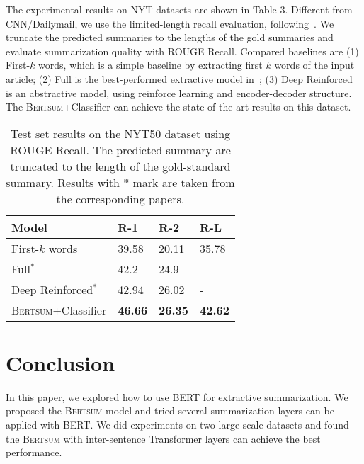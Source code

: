     The experimental results on NYT datasets are shown in Table 3. Different from CNN/Dailymail, we use the limited-length recall evaluation, following~\citet{durrett2016learning}. We truncate the predicted summaries to the lengths of the gold summaries and evaluate summarization quality with ROUGE Recall. 
    Compared baselines are (1) First-$k$ words, which is a simple baseline by extracting first $k$ words of the input article; (2) Full is the best-performed extractive model in~\citet{durrett2016learning}; (3) Deep Reinforced~\cite{paulus2017deep} is an abstractive model, using reinforce learning and encoder-decoder structure. The \textsc{Bertsum}+Classifier  can achieve the state-of-the-art results on this dataset.
    
    

    
    \begin{table}[!htbp]
        \center
        \begin{tabular}{l|lll}
            Model           & R-1    & R-2    & R-L    \\ \hline
            First-$k$ words   &39.58 & 20.11 & 35.78 \\
            Full$^*$            & 42.2  & 24.9  & -     \\
            Deep Reinforced$^*$ & 42.94 &26.02 & -     \\
            \textsc{Bertsum}+Classifier          & \textbf{46.66}    &  \textbf{26.35 } & \textbf{42.62} 
        \end{tabular}
        \caption{Test set results on  the NYT50  dataset using  ROUGE Recall. The predicted summary are truncated to the length of the gold-standard summary. Results with $*$ mark
            are taken from the corresponding papers.}
    \end{table}
    
            \section{Conclusion} 
            In this paper, we explored how to use BERT for extractive summarization.
            We proposed the \textsc{Bertsum} model and tried several summarization layers can be applied with BERT. We did experiments on two large-scale datasets and found the \textsc{Bertsum} with inter-sentence Transformer layers can achieve the best performance.

